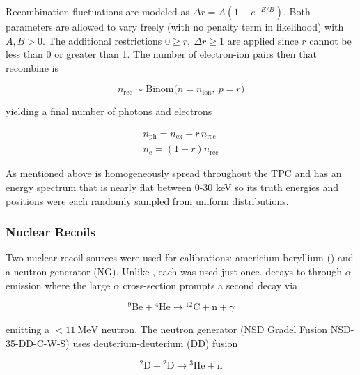 Recombination fluctuations are modeled as $\Delta r = A(1 - e^{-E/B})$.  Both parameters are allowed
to vary freely (with no penalty term in likelihood) with $A,B > 0$.  The additional
restrictions $0 \geq r,\ \Delta r \geq 1$ are applied since $r$ cannot be less than 0 or greater than 1.  The number of electron-ion pairs
then that recombine is

\begin{equation}
n_{\mathrm{rec}} \sim \mathrm{Binom} \big(n = n_{\mathrm{ion}},\ p = r \big)
\end{equation}

\noindent yielding a final number of photons and electrons

\begin{equation}
\begin{aligned}
n_{\mathrm{ph}} = n_{\mathrm{ex}} + r\, n_{\mathrm{rec}} \\
n_{\mathrm{e}} = (1 - r) n_{\mathrm{rec}}
\end{aligned}
\end{equation}

\noindent  As mentioned above  is homogeneously spread throughout the TPC and has an energy spectrum that is nearly flat
between 0-30 keV so its truth energies and positions were each randomly sampled from uniform distributions.



\subsubsection{Nuclear Recoils}
\label{subsubsec:er_nr_calibrations_parameter_determ_nr}
Two nuclear recoil sources were used for calibrations: americium beryllium () and a neutron generator (NG).  Unlike ,
each was used just once.  \ambe decays to  through $\alpha$-emission where the large  $\alpha$ cross-section
prompts a second decay via

\begin{equation}
\mathrm{^{9}Be} + \mathrm{^{4}He} \rightarrow \mathrm{^{12}C + n} + \gamma
\end{equation}

\noindent emitting a $< 11\ \mathrm{MeV}$ neutron.  The neutron generator (NSD Gradel Fusion NSD-35-DD-C-W-S) uses
deuterium-deuterium (DD) fusion

\begin{equation}
\mathrm{^{2}D} + \mathrm{^{2}D} \rightarrow \mathrm{^{3}He} + \mathrm{n}
\end{equation}

